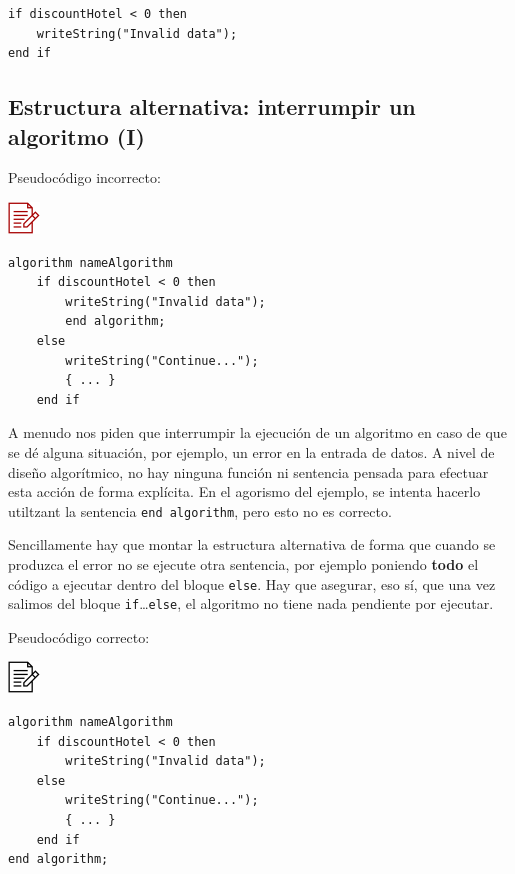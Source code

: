 \documentclass[
]{book}
\begin{document}
\begin{verbatim}
if discountHotel < 0 then
    writeString("Invalid data");
end if
\end{verbatim}

\hypertarget{estructura-alternativa-interrumpir-un-algoritmo-i}{%
\subsection{Estructura alternativa: interrumpir un algoritmo (I)}\label{estructura-alternativa-interrumpir-un-algoritmo-i}}

Pseudocódigo incorrecto:

\includegraphics{./img/alg_err.png}

\begin{verbatim}
algorithm nameAlgorithm
    if discountHotel < 0 then
        writeString("Invalid data");
        end algorithm;
    else
        writeString("Continue...");
        { ... }
    end if
\end{verbatim}

A menudo nos piden que interrumpir la ejecución de un algoritmo en caso de que se dé alguna situación, por ejemplo, un error en la entrada de datos. A nivel de diseño algorítmico, no hay ninguna función ni sentencia pensada para efectuar esta acción de forma explícita. En el agorismo del ejemplo, se intenta hacerlo utiltzant la sentencia \texttt{end\ algorithm}, pero esto no es correcto.

Sencillamente hay que montar la estructura alternativa de forma que cuando se produzca el error no se ejecute otra sentencia, por ejemplo poniendo \textbf{todo} el código a ejecutar dentro del bloque \texttt{else}. Hay que asegurar, eso sí, que una vez salimos del bloque \texttt{if}\ldots{}\texttt{else}, el algoritmo no tiene nada pendiente por ejecutar.

Pseudocódigo correcto:

\includegraphics{./img/alg.png}

\begin{verbatim}
algorithm nameAlgorithm
    if discountHotel < 0 then
        writeString("Invalid data");
    else
        writeString("Continue...");
        { ... }
    end if
end algorithm;
\end{verbatim}
\end{document}
